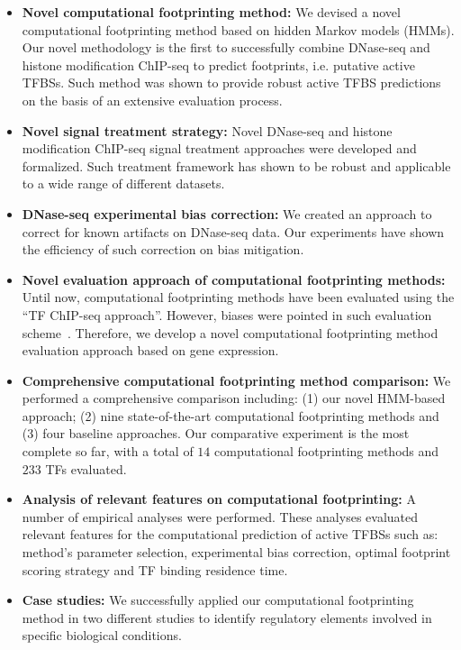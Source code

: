 \begin{itemize}
  \item \textbf{Novel computational footprinting method:} We devised a novel computational footprinting method based on hidden Markov models (HMMs). Our novel methodology is the first to successfully combine DNase-seq and histone modification ChIP-seq to predict footprints, i.e. putative active TFBSs. Such method was shown to provide robust active TFBS predictions on the basis of an extensive evaluation process.
  \item \textbf{Novel signal treatment strategy:} Novel DNase-seq and histone modification ChIP-seq signal treatment approaches were developed and formalized. Such treatment framework has shown to be robust and applicable to a wide range of different datasets.
  \item \textbf{DNase-seq experimental bias correction:} We created an approach to correct for known artifacts on DNase-seq data. Our experiments have shown the efficiency of such correction on bias mitigation.
  \item \textbf{Novel evaluation approach of computational footprinting methods:} Until now, computational footprinting methods have been evaluated using the ``TF ChIP-seq approach''. However, biases were pointed in such evaluation scheme~\citep{yardimci2014}. Therefore, we develop a novel computational footprinting method evaluation approach based on gene expression.
  \item \textbf{Comprehensive computational footprinting method comparison:} We performed a comprehensive comparison including: (1) our novel HMM-based approach; (2) nine state-of-the-art computational footprinting methods and (3) four baseline approaches. Our comparative experiment is the most complete so far, with a total of $14$ computational footprinting methods and $233$ TFs evaluated.
  \item \textbf{Analysis of relevant features on computational footprinting:} A number of empirical analyses were performed. These analyses evaluated relevant features for the computational prediction of active TFBSs such as: method's parameter selection, experimental bias correction, optimal footprint scoring strategy and TF binding residence time.
  \item \textbf{Case studies:} We successfully applied our computational footprinting method in two different studies to identify regulatory elements involved in specific biological conditions.
\end{itemize}

